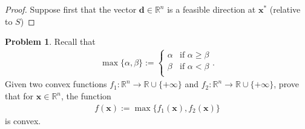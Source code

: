 \documentclass[12pt]{article}
\theoremstyle{definition}
\newtheorem{problem}{Problem}
\newcommand{\vc}[1]{\boldsymbol{#1}}
\begin{document}
\begin{proof}
  Suppose first that the vector $\vc{d} \in \mathbb{R}^n$ is a feasible
  direction at $\vc{x}^*$ (relative to $S$)
\end{proof}
\newpage


\begin{problem}
  Recall that
  \begin{align*}
    \max\{\alpha, \beta\} :=
    \begin{cases}
      \alpha & \text{if $\alpha \geq \beta$} \\
      \beta & \text{if $\alpha < \beta$} \\
    \end{cases}.
  \end{align*}
  Given two convex functions $f_1: \mathbb{R}^n \to \mathbb{R} \cup \{+\infty\}$
  and $f_2: \mathbb{R}^n \to \mathbb{R} \cup \{+\infty\}$, prove that for
  $\vc{x} \in \mathbb{R}^n$, the function
  \begin{align*}
    f(\vc{x}) := \max\{f_1(\vc{x}), f_2(\vc{x})\}
  \end{align*}
  is convex.
\end{problem}
\end{document}
